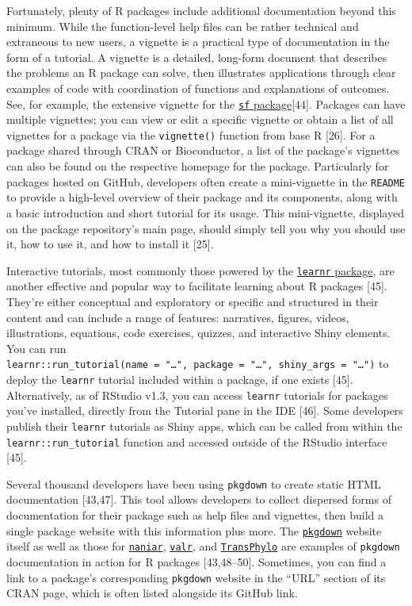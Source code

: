 \documentclass[10pt,letterpaper]{article}
\begin{document}
Fortunately, plenty of R packages include additional documentation
beyond this minimum. While the function-level help files can be rather
technical and extraneous to new users, a vignette is a practical type of
documentation in the form of a tutorial. A vignette is a detailed,
long-form document that describes the problems an R package can solve,
then illustrates applications through clear examples of code with
coordination of functions and explanations of outcomes. See, for
example, the extensive vignette for the
\href{https://cran.r-project.org/web/packages/sf/vignettes/sf1.html}{\texttt{sf}
package}{[}44{]}. Packages can have multiple vignettes; you can view or
edit a specific vignette or obtain a list of all vignettes for a package
via the \texttt{vignette()} function from base R {[}26{]}. For a package
shared through CRAN or Bioconductor, a list of the package's vignettes
can also be found on the respective homepage for the package.
Particularly for packages hosted on GitHub, developers often create a
mini-vignette in the \texttt{README} to provide a high-level overview of
their package and its components, along with a basic introduction and
short tutorial for its usage. This mini-vignette, displayed on the
package repository's main page, should simply tell you why you should
use it, how to use it, and how to install it {[}25{]}.

Interactive tutorials, most commonly those powered by the
\href{https://rstudio.github.io/learnr/}{\texttt{learnr} package}, are
another effective and popular way to facilitate learning about R
packages {[}45{]}. They're either conceptual and exploratory or specific
and structured in their content and can include a range of features:
narratives, figures, videos, illustrations, equations, code exercises,
quizzes, and interactive Shiny elements. You can run
\texttt{learnr::run\_tutorial(name\ =\ "\ldots{}",\ package\ =\ "\ldots{}",\ shiny\_args\ =\ "\ldots{}")}
to deploy the \texttt{learnr} tutorial included within a package, if one
exists {[}45{]}. Alternatively, as of RStudio v1.3, you can access
\texttt{learnr} tutorials for packages you've installed, directly from
the Tutorial pane in the IDE {[}46{]}. Some developers publish their
\texttt{learnr} tutorials as Shiny apps, which can be called from within
the \texttt{learnr::run\_tutorial} function and accessed outside of the
RStudio interface {[}45{]}.

Several thousand developers have been using \texttt{pkgdown} to create
static HTML documentation {[}43,47{]}. This tool allows developers to
collect dispersed forms of documentation for their package such as help
files and vignettes, then build a single package website with this
information plus more. The
\href{https://pkgdown.r-lib.org/}{\texttt{pkgdown}} website itself as
well as those for
\href{http://naniar.njtierney.com/index.html}{\texttt{naniar}},
\href{https://rnabioco.github.io/valr/}{\texttt{valr}}, and
\href{https://xavierdidelot.github.io/TransPhylo/articles/TransPhylo.html}{\texttt{TransPhylo}}
are examples of \texttt{pkgdown} documentation in action for R packages
{[}43,48--50{]}. Sometimes, you can find a link to a package's
corresponding \texttt{pkgdown} website in the ``URL'' section of its
CRAN page, which is often listed alongside its GitHub link.
\end{document}
